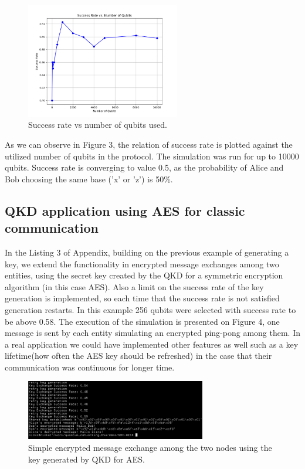\documentclass[12pt]{ieeetj}
\begin{document}
		\begin{figure}[H]
			\centering
			\includegraphics[width=0.6\textwidth]{bb84/success_rate_vs_num_qubits.png}
			\caption{Success rate vs number of qubits used.}
			\label{fig3:}
		\end{figure}		

		As we can observe in Figure 3, the relation of success rate is plotted against the utilized 
		number of qubits in the protocol. The simulation was run for up to 10000 qubits. 
		Success rate is converging to value 0.5, as the probability 
		of Alice and Bob choosing the same base ('x' or 'z') is 50\%.


		\subsection{QKD application using AES for classic communication}

		In the Listing 3 of Appendix, building on the previous example of generating a key,
		we extend the functionality in encrypted message exchanges among two entities, using the secret key created
		by the QKD for a symmetric encryption algorithm (in this case AES). 
		Also a limit on the success rate of the key generation is implemented,
		so each time that the success rate is not satisfied
		generation restarts. In this example 256 qubits were selected with success rate to be above 0.58.
		The execution of the simulation is presented on Figure 4, one message is sent by each entity simulating
		an encrypted ping-pong among them. In a real application we could have implemented 
		other features as well such as a key lifetime(how often the AES key should be refreshed) in the case that
		their communication was continuous for longer time.
		
		\begin{figure}[H]
			\centering
			\includegraphics[width=0.7\textwidth]{qkd_aes/app.png}
			\caption{Simple encrypted message exchange among the two nodes using the key generated by QKD for AES.}
			\label{fig4:}
		\end{figure}		
\end{document}
